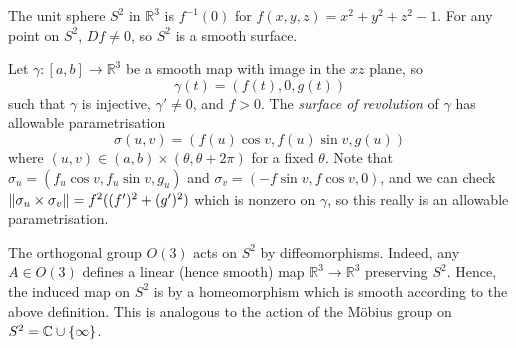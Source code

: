 \begin{example}
	The unit sphere \( S^2 \) in \( \mathbb R^3 \) is \( f^{-1}(0) \) for \( f(x,y,z) = x^2 + y^2 + z^2 - 1 \).
	For any point on \( S^2 \), \( Df \neq 0 \), so \( S^2 \) is a smooth surface.
\end{example}
\begin{example}
	Let \( \gamma \colon [a,b] \to \mathbb R^3 \) be a smooth map with image in the \( xz \) plane, so
	\[
		\gamma(t) = (f(t), 0, g(t))
	\]
	such that \( \gamma \) is injective, \( \gamma' \neq 0 \), and \( f > 0 \).
	The \textit{surface of revolution} of \( \gamma \) has allowable parametrisation
	\[
		\sigma(u,v) = (f(u)\cos v, f(u)\sin v, g(u))
	\]
	where \( (u,v) \in (a,b) \times (\theta, \theta + 2\pi) \) for a fixed \( \theta \).
	Note that \( \sigma_u = (f_u \cos v, f_u \sin v, g_u) \) and \( \sigma_v = (-f\sin v, f \cos v, 0) \), and we can check \( \norm{\sigma_u \times \sigma_v} = f^2 ((f')^2 + (g')^2) \) which is nonzero on \( \gamma \), so this really is an allowable parametrisation.
\end{example}
\begin{example}
	The orthogonal group \( O(3) \) acts on \( S^2 \) by diffeomorphisms.
	Indeed, any \( A \in O(3) \) defines a linear (hence smooth) map \( \mathbb R^3 \to \mathbb R^3 \) preserving \( S^2 \).
	Hence, the induced map on \( S^2 \) is by a homeomorphism which is smooth according to the above definition.
	This is analogous to the action of the M\"obius group on \( S^2 = \mathbb C \cup \qty{\infty} \).
\end{example}

